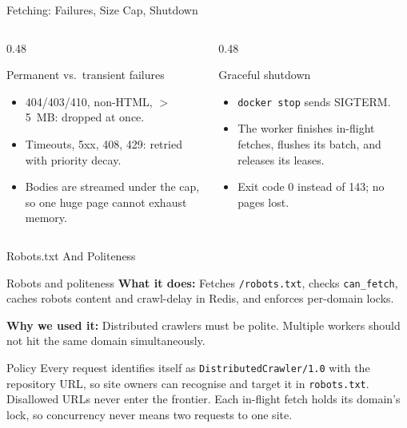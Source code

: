 \documentclass[aspectratio=169,11pt]{beamer}
\newcommand{\component}[3]{%
  \begin{block}{#1}
    \textbf{What it does:} #2

    \vspace{0.35em}
    \textbf{Why we used it:} #3
  \end{block}
}
\begin{document}
\begin{frame}{Fetching: Failures, Size Cap, Shutdown}
  \begin{columns}[T,totalwidth=\textwidth]
    \begin{column}{0.48\textwidth}
      \begin{block}{Permanent vs.\ transient failures}
        \begin{itemize}
          \item 404/403/410, non-HTML, $>$5~MB: dropped at once.
          \item Timeouts, 5xx, 408, 429: retried with priority decay.
          \item Bodies are streamed under the cap, so one huge page cannot exhaust memory.
        \end{itemize}
      \end{block}
    \end{column}
    \begin{column}{0.48\textwidth}
      \begin{block}{Graceful shutdown}
        \begin{itemize}
          \item \texttt{docker stop} sends SIGTERM.
          \item The worker finishes in-flight fetches, flushes its batch, and releases its leases.
          \item Exit code 0 instead of 143; no pages lost.
        \end{itemize}
      \end{block}
    \end{column}
  \end{columns}
\end{frame}

\begin{frame}{Robots.txt And Politeness}
  \component{Robots and politeness}
  {Fetches \texttt{/robots.txt}, checks \texttt{can\_fetch}, caches robots content and crawl-delay in Redis, and enforces per-domain locks.}
  {Distributed crawlers must be polite. Multiple workers should not hit the same domain simultaneously.}

  \begin{block}{Policy}
    Every request identifies itself as \texttt{DistributedCrawler/1.0} with the repository URL, so site owners can recognise and target it in \texttt{robots.txt}. Disallowed URLs never enter the frontier. Each in-flight fetch holds its domain's lock, so concurrency never means two requests to one site.
  \end{block}
\end{frame}
\end{document}
